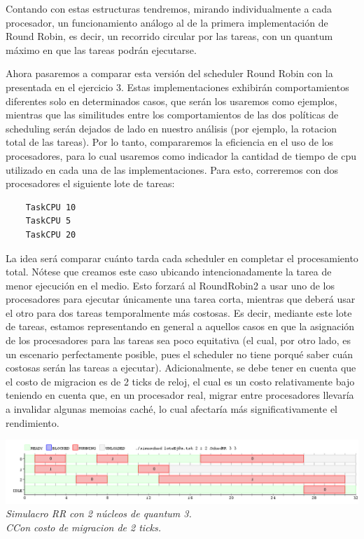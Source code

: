 Contando con estas estructuras tendremos, mirando individualmente a cada procesador, un funcionamiento an\'alogo al de la primera implementaci\'on
de Round Robin, es decir, un recorrido circular por las tareas, con un quantum m\'aximo en que las tareas podr\'an ejecutarse.

Ahora pasaremos a comparar esta versi\'on del scheduler Round Robin con la presentada en el ejercicio 3. Estas implementaciones exhibir\'an comportamientos 
diferentes solo en determinados casos, que ser\'an los usaremos como ejemplos, mientras que las similitudes entre los comportamientos de las dos pol\'iticas
de scheduling ser\'an dejados de lado en nuestro an\'alisis (por ejemplo, la rotacion total de 
las tareas). Por lo tanto, compararemos la eficiencia en el uso de los procesadores, para lo cual usaremos como indicador la cantidad de tiempo de cpu 
utilizado en cada una de las implementaciones.
Para esto, correremos con dos procesadores el siguiente lote de tareas:

\begin{verbatim}
    TaskCPU 10
    TaskCPU 5
    TaskCPU 20
\end{verbatim}

 La idea ser\'a comparar cu\'anto tarda cada scheduler en completar el procesamiento total. N\'otese que creamos este caso ubicando 
 intencionadamente la tarea de menor ejecuci\'on en el medio. Esto forzar\'a al RoundRobin2 a usar uno de los procesadores 
 para ejecutar \'unicamente una tarea corta, mientras que deber\'a usar el otro para dos tareas temporalmente m\'as costosas.
 Es decir, mediante este lote de tareas, estamos representando en general a aquellos casos en que la asignaci\'on de los procesadores 
 para las tareas sea poco equitativa (el cual, por otro lado, es un escenario perfectamente posible, pues el scheduler no tiene porqu\'e
 saber cu\'an costosas ser\'an las tareas a ejecutar). Adicionalmente, se debe tener en cuenta que el costo de migracion 
 es de 2 ticks de reloj, el cual es un costo relativamente bajo teniendo en cuenta que, en un procesador real, migrar entre procesadores
 llevar\'ia a invalidar algunas memoias cach\'e, lo cual afectar\'ia m\'as significativamente el rendimiento.

\vspace{\baselineskip}
\begin{center}
\includegraphics[scale=0.45]{../tp1/Test/resEj8Co2SBRR.png}
\\
\vspace{1pt}
\footnotesize\textit{Simulacro RR con 2 n\'ucleos de quantum 3.\\CCon costo de migracion de 2 ticks.}
\end{center}
\vspace{\baselineskip}

